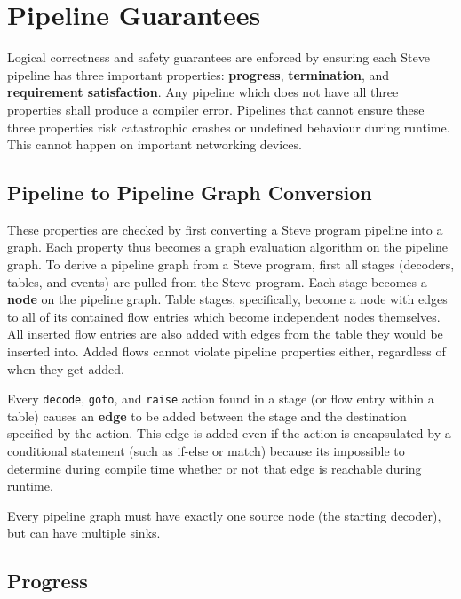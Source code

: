 \section{Pipeline Guarantees} \label{pipeline_checking_guide}

Logical correctness and safety guarantees are enforced by ensuring each Steve pipeline has three important properties: \textbf{progress}, \textbf{termination}, and \textbf{requirement satisfaction}. Any pipeline which does not have all three properties shall produce a compiler error. Pipelines that cannot ensure these three properties risk catastrophic crashes or undefined behaviour during runtime. This cannot happen on important networking devices.

\subsection{Pipeline to Pipeline Graph Conversion} \label{pipeline_graph}

These properties are checked by first converting a Steve program pipeline into a graph. Each property thus becomes a graph evaluation algorithm on the pipeline graph. To derive a pipeline graph from a Steve program, first all stages (decoders, tables, and events) are pulled from the Steve program. Each stage becomes a \textbf{node} on the pipeline graph. Table stages, specifically, become a node with edges to all of its contained flow entries which become independent nodes themselves. All inserted flow entries are also added with edges from the table they would be inserted into. Added flows cannot violate pipeline properties either, regardless of when they get added.

Every \texttt{decode}, \texttt{goto}, and \texttt{raise} action found in a stage (or flow entry within a table) causes an \textbf{edge} to be added between the stage and the destination specified by the action. This edge is added even if the action is encapsulated by a conditional statement (such as if-else or match) because its impossible to determine during compile time whether or not that edge is reachable during runtime. 

Every pipeline graph must have exactly one source node (the starting decoder), but can have multiple sinks.

\subsection{Progress} \label{progress_guide}

